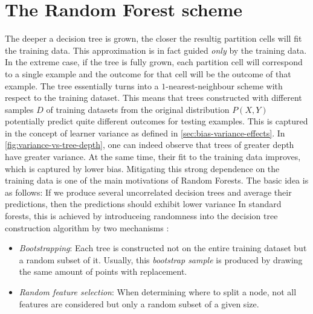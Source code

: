 \documentclass[../main.tex]{subfiles}
\begin{document}
\section{The Random Forest scheme}
\label{sec:random-forest-scheme}



The deeper a decision tree is grown, the closer the resultig partition cells will fit the training data. This approximation is in fact guided \textit{only} by the training data. In the extreme case, if the tree is fully grown, each partition cell will correspond to a single example and the outcome for that cell will be the outcome of that example. The tree essentially turns into a $1$-nearest-neighbour scheme with respect to the training dataset. This means that trees constructed with different samples $D$ of training datasets from the original distribution $P(X,Y)$ potentially predict quite different outcomes for testing examples. This is captured in the concept of learner variance as defined in \ref{sec:bias-variance-effects}. In \ref{fig:variance-vs-tree-depth}, one can indeed observe that trees of greater depth have greater variance. At the same time, their fit to the training data improves, which is captured by lower bias.
Mitigating this strong dependence on the training data is one of the main motivations of Random Forests. The basic idea is as follows: If we produce several uncorrelated decision trees and average their predictions, then the predictions should exhibit lower variance
In standard forests, this is achieved by introduceing randomness into the decision tree construction algorithm by two mechanisms \cite{scornet_ConsistencyRandomForests_2015,breiman_RandomForests_2001}:
\begin{itemize}
\item \textit{Bootstrapping}: Each tree is constructed not on the entire training dataset but a random subset of it. Usually, this \textit{bootstrap sample} is produced by drawing the same amount of points with replacement.
\item \textit{Random feature selection}: When determining where to split a node, not all features are considered but only a random subset of a given size.
\end{itemize}
\end{document}
